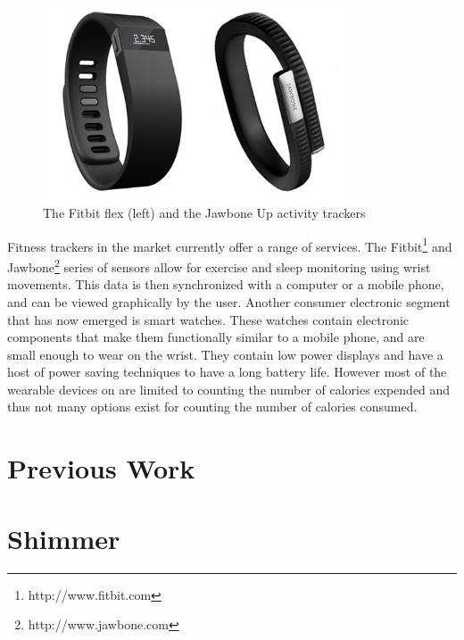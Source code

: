 \begin{figure}
\begin{center}
\includegraphics[width=0.8\textwidth]{images/JawFit.png}
\caption{The Fitbit flex (left) and the Jawbone Up activity trackers}
\label{fig:FitbitJawbone}

\end{center}
\end{figure}
Fitness trackers in the market currently offer a range of services. The Fitbit\footnote{http://www.fitbit.com} and Jawbone\footnote{http://www.jawbone.com} series of sensors allow for exercise and sleep monitoring using wrist movements. This data is then synchronized with a computer or a mobile phone, and can be viewed graphically by the user. Another consumer electronic segment that has now emerged is smart watches. These watches contain electronic components that make them functionally similar to a mobile phone, and are small enough to wear on the wrist. They contain low power displays and have a host of power saving techniques to have a long battery life. However most of the wearable devices on are limited to counting the number of calories expended and thus not many options exist for counting the number of calories consumed.

\section{Previous Work}

\section{Shimmer}

